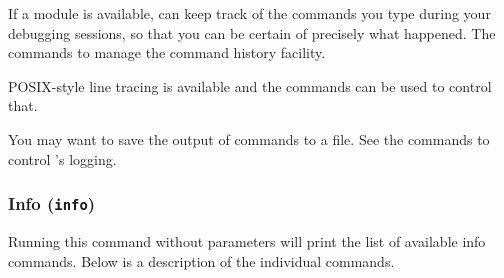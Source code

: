 If a
module is available,  can keep track of the commands you
type during your debugging sessions, so that you can be certain of
precisely what happened.  The  commands to manage
the command history facility.

POSIX-style line tracing is available and the 
commands can be used to control that.

You may want to save the output of  commands to a file.
See the  commands to control 's logging.

\subsubsection{Info ({\tt info})\label{subsubsection-info}}

Running this command without parameters will print the list of
available info commands. Below is a description of the individual
commands.

